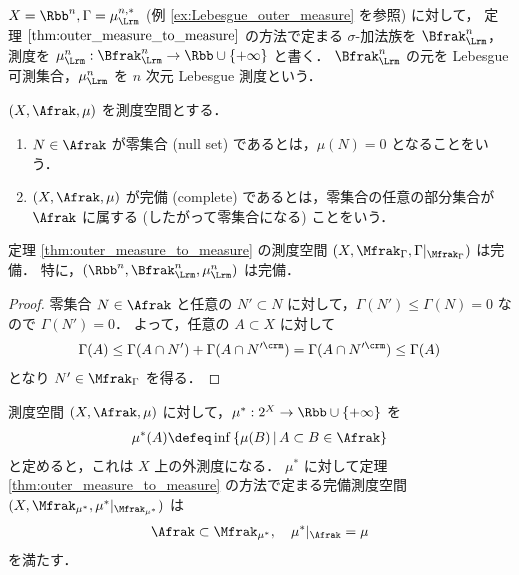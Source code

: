 \begin{example}
    $X=\Rbb^n,\Gamma=\mu_\Lrm^{n,\ast}$ (例 \ref{ex:Lebesgue_outer_measure} を参照) に対して，
    定理 $\ref{thm:outer_measure_to_measure}$ の方法で定まる $\sigma$-加法族を $\Bfrak_\Lrm^n$，測度を $\mu_\Lrm^n:\Bfrak_\Lrm^n\to\Rbb\cup\{+\infty\}$ と書く．
    $\Bfrak_\Lrm^n$ の元を Lebesgue 可測集合，$\mu_\Lrm^n$ を $n$ 次元 Lebesgue 測度という．
\end{example}

\begin{definition}
    $(X,\Afrak,\mu)$ を測度空間とする．
    \begin{enumerate}
        \item $N\in\Afrak$ が零集合 (null set) であるとは，$\mu(N)=0$ となることをいう．
        \item $(X,\Afrak,\mu)$ が完備 (complete) であるとは，零集合の任意の部分集合が $\Afrak$ に属する (したがって零集合になる) ことをいう．
    \end{enumerate}
\end{definition}

\begin{proposition}
    定理 \ref{thm:outer_measure_to_measure} の測度空間 $(X,\Mfrak_\Gamma,\Gamma\vert_{\Mfrak_\Gamma})$ は完備．
    特に，$(\Rbb^n,\Bfrak_\Lrm^n,\mu_\Lrm^n)$ は完備．
\end{proposition}

\begin{proof}
    零集合 $N\in\Afrak$ と任意の $N'\subset N$ に対して，$\Gamma(N')\le\Gamma(N)=0$ なので $\Gamma(N')=0$．
    よって，任意の $A\subset X$ に対して
    \begin{align*}
        \Gamma(A)
        \le\Gamma(A\cap N')+\Gamma(A\cap N'^\crm)
        =\Gamma(A\cap N'^\crm)
        \le\Gamma(A)
    \end{align*}
    となり $N'\in\Mfrak_\Gamma$ を得る．
\end{proof}

\begin{proposition}\label{prop:measure_completion}
    測度空間 $(X,\Afrak,\mu)$ に対して，$\mu^\ast:2^X\to\Rbb\cup\{+\infty\}$ を
    \begin{align*}
        \mu^\ast(A)\defeq\inf\left\{
            \mu(B)\,\middle\vert\,A\subset B\in\Afrak
        \right\}
    \end{align*}
    と定めると，これは $X$ 上の外測度になる．
    $\mu^\ast$ に対して定理 \ref{thm:outer_measure_to_measure} の方法で定まる完備測度空間
    $(X,\Mfrak_{\mu^*},\mu^\ast\vert_{\Mfrak_{\mu^\ast}})$ は
    \begin{gather*}
        \Afrak\subset\Mfrak_{\mu^*},\quad
        \mu^\ast\vert_\Afrak=\mu
    \end{gather*}
    を満たす．
\end{proposition}

